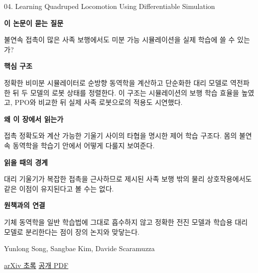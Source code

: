 \documentclass[11pt,openany]{book}
\begin{document}
\begin{termcard}{04. Learning Quadruped Locomotion Using Differentiable Simulation}

\par

\medskip

{\sffamily\bfseries\color{deepblue} 이 논문이 묻는 질문}\par

불연속 접촉이 많은 사족 보행에서도 미분 가능 시뮬레이션을 실제 학습에 쓸 수 있는가?

\smallskip

{\sffamily\bfseries\color{deepblue} 핵심 구조}\par

정확한 비미분 시뮬레이터로 순방향 동역학을 계산하고 단순화한 대리 모델로 역전파한 뒤 두 모델의 로봇 상태를 정렬한다. 이 구조는 시뮬레이션의 보행 학습 효율을 높였고, PPO와 비교한 뒤 실제 사족 로봇으로의 적용도 시연했다.

\smallskip

{\sffamily\bfseries\color{deepblue} 왜 이 장에서 읽는가}\par

접촉 정확도와 계산 가능한 기울기 사이의 타협을 명시한 제어 학습 구조다. 몸의 불연속 동역학을 학습기 안에서 어떻게 다룰지 보여준다.

\smallskip

{\sffamily\bfseries\color{coral} 읽을 때의 경계}\par

대리 기울기가 복잡한 접촉을 근사하므로 제시된 사족 보행 밖의 물리 상호작용에서도 같은 이점이 유지된다고 볼 수는 없다.

\smallskip

{\sffamily\bfseries\color{teal} 원책과의 연결}\par

기체 동역학을 일반 학습법에 그대로 흡수하지 않고 정확한 전진 모델과 학습용 대리 모델로 분리한다는 점이 장의 논지와 맞닿는다.

\medskip

{\footnotesize\color{muted} Yunlong Song, Sangbae Kim, Davide Scaramuzza\par

\href{https://arxiv.org/abs/2403.14864}{arXiv 초록} \quad \href{https://arxiv.org/pdf/2403.14864}{공개 PDF}\par}

\end{termcard}
\end{document}
